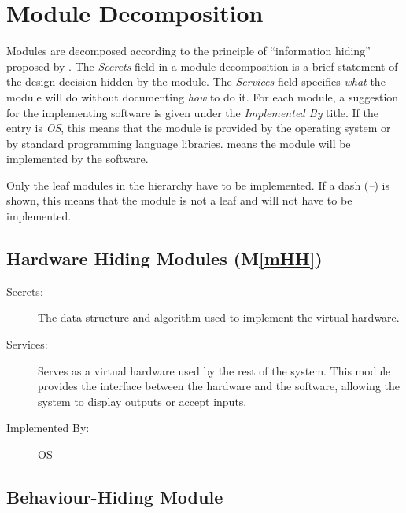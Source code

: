 \documentclass[12pt, titlepage]{article}
\newcommand{\mref}[1]{M\ref{#1}}
\begin{document}

\section{Module Decomposition} \label{SecMD}

Modules are decomposed according to the principle of ``information hiding''
proposed by \citet{ParnasEtAl1984}. The \emph{Secrets} field in a module
decomposition is a brief statement of the design decision hidden by the
module. The \emph{Services} field specifies \emph{what} the module will do
without documenting \emph{how} to do it. For each module, a suggestion for the
implementing software is given under the \emph{Implemented By} title. If the
entry is \emph{OS}, this means that the module is provided by the operating
system or by standard programming language libraries.  \emph{\progname{}} means the
module will be implemented by the \progname{} software.

Only the leaf modules in the hierarchy have to be implemented. If a dash
(\emph{--}) is shown, this means that the module is not a leaf and will not have
to be implemented.

\subsection{Hardware Hiding Modules (\mref{mHH})}

\begin{description}
\item[Secrets:] The data structure and algorithm used to implement the virtual
  hardware.
\item[Services:] Serves as a virtual hardware used by the rest of the
  system. This module provides the interface between the hardware and the
  software, allowing the system to display outputs or accept inputs.
\item[Implemented By:] OS
\end{description}

\subsection{Behaviour-Hiding Module}
\end{document}
